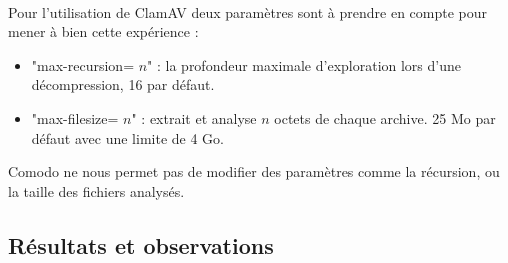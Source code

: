 \documentclass{svjour3}
\begin{document}
\\Pour l'utilisation de ClamAV deux paramètres sont à prendre en compte pour mener à bien cette expérience :
\begin{itemize}
\item "max-recursion= $n$" : la profondeur maximale d'exploration lors d'une décompression, 16 par défaut.
\item "max-filesize= $n$" : extrait et analyse $n$ octets de chaque archive. 25 Mo par défaut avec une limite de 4 Go.
\end{itemize}
Comodo ne nous permet pas de modifier des paramètres comme la récursion, ou la taille des fichiers analysés.
\subsection{Résultats et observations}
\label{3.2résultats}
\end{document}
